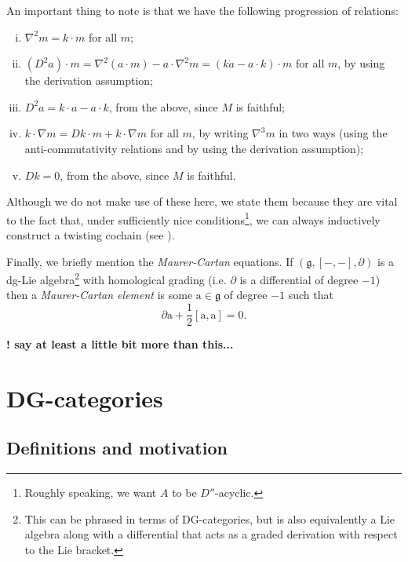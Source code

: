         An important thing to note is that we have the following progression of relations:
        \begin{enumerate}[(i)]
            \item $\nabla^2m = k\cdot m$ for all $m$;
            \item $(D^2a)\cdot m = \nabla^2(a\cdot m)-a\cdot\nabla^2m = (k\dot a-a\cdot k)\cdot m$ for all $m$, by using the derivation assumption;
            \item $D^2a=k\cdot a-a\cdot k$, from the above, since $M$ is faithful;
            \item $k\cdot\nabla m = Dk\cdot m+k\cdot\nabla m$ for all $m$, by writing $\nabla^3m$ in two ways (using the anti-commutativity relations and by using the derivation assumption);
            \item $Dk=0$, from the above, since $M$ is faithful.
        \end{enumerate}
        Although we do not make use of these here, we state them because they are vital to the fact that, under sufficiently nice conditions\footnote{Roughly speaking, we want $A$ to be $D''$-acyclic.}, we can always inductively construct a twisting cochain (see \cite[Lemma~8.13]{Toledo:1976gy}).

        \bigskip

        Finally, we briefly mention the \textit{Maurer-Cartan} equations.
        If $(\mathfrak{g},[-,-],\partial)$ is a dg-Lie algebra\footnote{This can be phrased in terms of DG-categories, but is also equivalently a Lie algebra along with a differential that acts as a graded derivation with respect to the Lie bracket.} with homological grading (i.e. $\partial$ is a differential of degree $-1$) then a \textit{Maurer-Cartan element} is some $\mathrm{a}\in\mathfrak{g}$ of degree $-1$ such that
        \[
            \partial\mathrm{a}+\frac12[\mathrm{a},\mathrm{a}]=0.
        \]

        {\color{red}\textbf{! say at least a little bit more than this...}}

\section{DG-categories}\label{sec:dg-categories}

    \subsection{Definitions and motivation}

